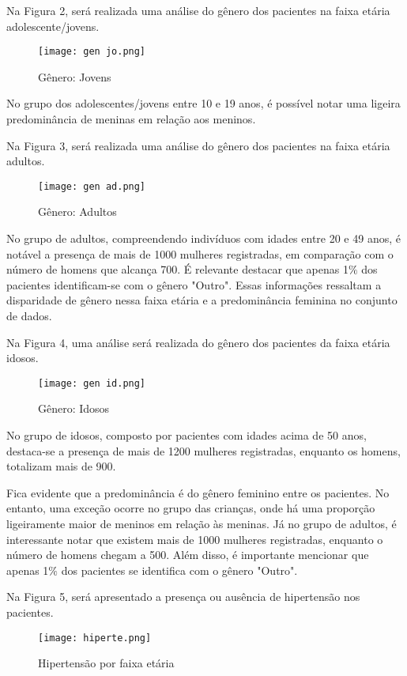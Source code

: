 \documentclass[conference]{IEEEtran}
\begin{document}
Na Figura 2, será realizada uma análise do gênero dos pacientes na faixa etária adolescente/jovens. 

\begin{figure}[H]
   \caption{Gênero: Jovens}
   \centering
   \texttt{[image: gen jo.png]}
\end{figure}

No grupo dos adolescentes/jovens entre 10 e 19 anos, é possível notar uma ligeira predominância de meninas em relação aos meninos.

Na Figura 3, será realizada uma análise do gênero dos pacientes na faixa etária adultos. 
\begin{figure}[H]
   \caption{Gênero: Adultos}
   \centering
   \texttt{[image: gen ad.png]}
\end{figure}
No grupo de adultos, compreendendo indivíduos com idades entre 20 e 49 anos, é notável a presença de mais de 1000 mulheres registradas, em comparação com o número de homens que alcança 700. É relevante destacar que apenas 1$\%$ dos pacientes identificam-se com o gênero "Outro". Essas informações ressaltam a disparidade de gênero nessa faixa etária e a predominância feminina no conjunto de dados.

Na Figura 4, uma análise será realizada do gênero dos pacientes da faixa etária idosos.

\begin{figure}[H]
   \caption{Gênero: Idosos}
   \centering
   \texttt{[image: gen id.png]}
\end{figure}
No grupo de idosos, composto por pacientes com idades acima de 50 anos, destaca-se a presença de mais de 1200 mulheres registradas, enquanto os homens, totalizam mais de 900. 

\label{AA}
Fica evidente que a predominância é do gênero feminino entre os pacientes. No entanto, uma exceção ocorre no grupo das crianças, onde há uma proporção ligeiramente maior de meninos em relação às meninas. Já no grupo de adultos, é interessante notar que existem mais de 1000 mulheres registradas, enquanto o número de homens chegam a 500. Além disso, é importante mencionar que apenas 1$\%$ dos pacientes se identifica com o gênero "Outro". 

Na Figura 5, será apresentado a presença ou ausência de hipertensão nos pacientes. 

\begin{figure}[H]
   \caption{Hipertensão por faixa etária}
   \centering
   \texttt{[image: hiperte.png]}
\end{figure}
\end{document}
